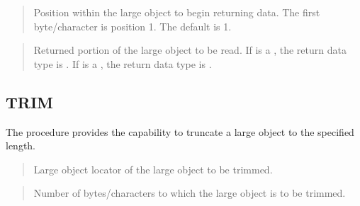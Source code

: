 \documentclass[letterpaper,10pt,english,openany,oneside]{sphinxmanual}
\begin{document}
\begin{quote}

Position within the large object to begin returning data. The first
byte/character is position 1. The default is 1.
\end{quote}

\begin{quote}

Returned portion of the large object to be read. If  is a
, the return data type is . If  is a , the return
data type is .
\end{quote}

\newpage


\subsection{TRIM}
\label{\detokenize{trim::doc}}\label{\detokenize{trim:trim}}
The  procedure provides the capability to truncate a large object to
the specified length.
\begin{quote}

\end{quote}


\begin{quote}

Large object locator of the large object to be trimmed.
\end{quote}

\begin{quote}

Number of bytes/characters to which the large object is to be trimmed.
\end{quote}

\newpage
\end{document}
